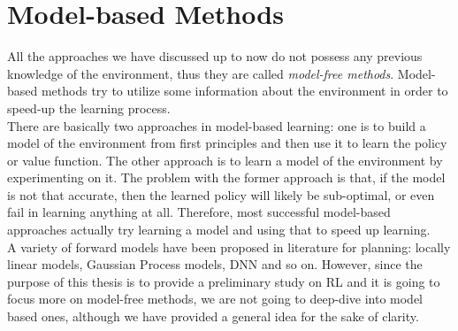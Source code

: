 \section{Model-based Methods}

All the approaches we have discussed up to now do not possess any previous knowledge of the environment, thus they are called \textit{model-free methods}. Model-based methods try to utilize some information about the environment in order to speed-up the learning process.
\\
\indent There are basically two approaches in model-based learning: one is to build a model of the environment from first principles and then use it to learn the policy or value function. The other approach is to learn a model of the environment by experimenting on it. The problem with the former approach is that, if the model is not that accurate, then the learned policy will likely be sub-optimal, or even fail in learning anything at all. Therefore, most successful model-based approaches actually try learning a model and using that to speed up learning.	
\\
\indent A variety of forward models %
have been proposed in literature for planning: locally linear models, Gaussian Process models, DNN and so on. However, since the purpose of this thesis is to provide a preliminary study on RL and it is going to focus more on model-free methods, we are not going to deep-dive into model based ones, although we have provided a general idea for the sake of clarity.

